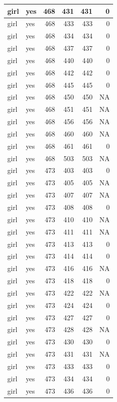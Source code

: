 \documentclass[man]{apa6}
\begin{document}
\begin{tabular}{l|l|r|r|r|r}
\hline
girl & yes & 468 & 431 & 431 & 0\\
\hline
girl & yes & 468 & 433 & 433 & 0\\
\hline
girl & yes & 468 & 434 & 434 & 0\\
\hline
girl & yes & 468 & 437 & 437 & 0\\
\hline
girl & yes & 468 & 440 & 440 & 0\\
\hline
girl & yes & 468 & 442 & 442 & 0\\
\hline
girl & yes & 468 & 445 & 445 & 0\\
\hline
girl & yes & 468 & 450 & 450 & NA\\
\hline
girl & yes & 468 & 451 & 451 & NA\\
\hline
girl & yes & 468 & 456 & 456 & NA\\
\hline
girl & yes & 468 & 460 & 460 & NA\\
\hline
girl & yes & 468 & 461 & 461 & 0\\
\hline
girl & yes & 468 & 503 & 503 & NA\\
\hline
girl & yes & 473 & 403 & 403 & 0\\
\hline
girl & yes & 473 & 405 & 405 & NA\\
\hline
girl & yes & 473 & 407 & 407 & NA\\
\hline
girl & yes & 473 & 408 & 408 & 0\\
\hline
girl & yes & 473 & 410 & 410 & NA\\
\hline
girl & yes & 473 & 411 & 411 & NA\\
\hline
girl & yes & 473 & 413 & 413 & 0\\
\hline
girl & yes & 473 & 414 & 414 & 0\\
\hline
girl & yes & 473 & 416 & 416 & NA\\
\hline
girl & yes & 473 & 418 & 418 & 0\\
\hline
girl & yes & 473 & 422 & 422 & NA\\
\hline
girl & yes & 473 & 424 & 424 & 0\\
\hline
girl & yes & 473 & 427 & 427 & 0\\
\hline
girl & yes & 473 & 428 & 428 & NA\\
\hline
girl & yes & 473 & 430 & 430 & 0\\
\hline
girl & yes & 473 & 431 & 431 & NA\\
\hline
girl & yes & 473 & 433 & 433 & 0\\
\hline
girl & yes & 473 & 434 & 434 & 0\\
\hline
girl & yes & 473 & 436 & 436 & 0\\

\end{tabular}
\end{document}
